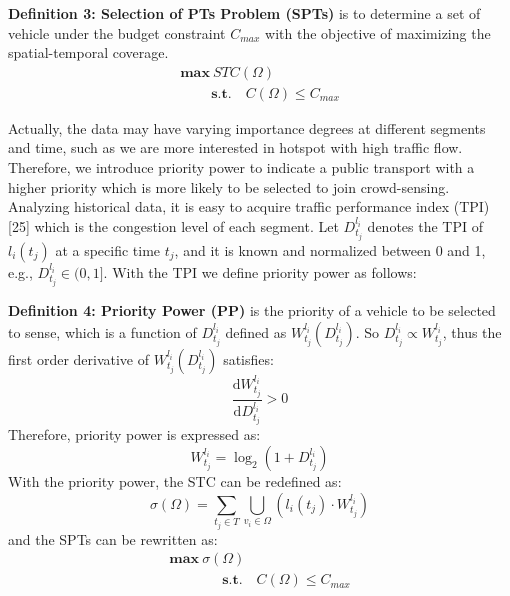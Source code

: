 \documentclass[journal]{IEEEtran}
\begin{document}
\noindent
\textbf{Definition 3: Selection of PTs Problem (SPTs)} is to determine a set of vehicle under the budget constraint $C_{max}$ with the objective of maximizing the spatial-temporal coverage.
\begin{equation}
\begin{matrix}
\textbf{max} \ STC(\Omega )\\\quad\quad\
\textbf{s.t.}\quad C(\Omega)\leqslant C_{max}\end{matrix}
\end{equation}

Actually, the data may have varying importance degrees at different segments and time, such as we are more interested in hotspot with high traffic flow. Therefore, we introduce priority power to indicate a public transport with a higher priority which is more likely to be selected to join crowd-sensing. Analyzing historical data, it is easy to acquire traffic performance index (TPI) [25] which is the congestion level of each segment. Let $D_{t_{j}}^{l_{i}}$ denotes the TPI of $l_{i} (t_{j})$ at a specific time $t_{j}$, and it is known and normalized between 0 and 1, e.g., $D_{t_{j}}^{l_{i}}\in (0,1]$. With the TPI we define priority power as follows:

\noindent
\textbf{Definition 4: Priority Power (PP)} is the priority of a vehicle to be selected to sense, which is a function of  $D_{t_{j}}^{l_{i}}$ defined as $W_{t_{j}}^{l_{i}}(D_{t_{j}}^{l_{i}})$. So $D_{t_{j}}^{l_{i}}\propto W_{t_{j}}^{l_{i}}$, thus the first order derivative of $W_{t_{j}}^{l_{i}}(D_{t_{j}}^{l_{i}})$ satisfies:
\begin{equation}
\frac{\mathrm{d}W_{t_{j}}^{l_{i}} }{\mathrm{d}D_{t_{j}}^{l_{i}}}> 0
\end{equation}
Therefore, priority power is expressed as:
\begin{equation}
W_{t_{j}}^{l_{i}}=\log_{2}(1+D_{t_{j}}^{l_{i}})
\end{equation}
With the priority power, the STC can be redefined as:
\begin{equation}
\sigma (\Omega )=\sum_{t_{j}\in T}\bigcup_{v_{i}\in \Omega }(l_{i}(t_{j})\cdot W_{t_{j}}^{l_{i}})
\end{equation}
and the SPTs can be rewritten as:
\begin{equation}
\begin{matrix}
\textbf{max}\  \sigma(\Omega)\\\quad\quad\quad\;\;\
\textbf{s.t.}\quad C(\Omega)\leqslant C_{max}\end{matrix}
\end{equation}
\end{document}
